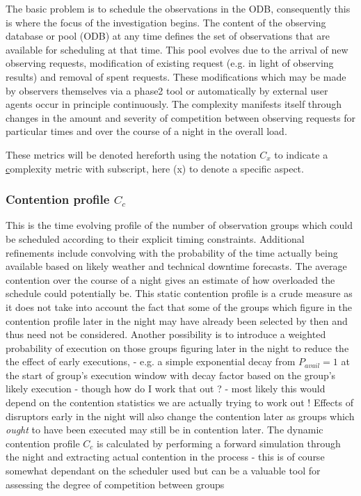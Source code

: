  The basic problem is to schedule the observations in the ODB, consequently this is where the focus of the investigation begins. The content of the observing database or pool (ODB) at any time defines the set of observations that are available for scheduling at that time. This pool evolves due to the arrival of new observing requests, modification of existing request (e.g. in light of observing results) and removal of spent requests. These modifications which may be made by observers themselves via a phase2 tool or automatically by external user agents occur in principle continuously. The complexity manifests itself through changes in the amount and severity of competition between observing requests for particular times and over the course of a night in the overall load.

These metrics will be denoted hereforth using the notation $C_x$ to indicate a \underline{c}omplexity metric with subscript, here (x) to denote a specific aspect.


\subsubsection{Contention profile $C_c$}
This is the time evolving profile of the number of observation groups which could be scheduled according to their explicit timing constraints. Additional refinements include convolving with the probability of the time actually being available based on likely weather and technical downtime forecasts. The average contention over the course of a night gives an estimate of how overloaded the schedule could potentially be. This static contention profile is a crude measure as it does not take into account the fact that some of the groups which figure in the contention profile later in the night may have already been selected by then and thus need not be considered. Another possibility is to introduce a weighted probability of execution on those groups figuring later in the night to reduce the the effect of early executions, - e.g. a simple exponential decay from $P_{avail}=1$ at the start of group's execution window with decay factor based on the group's likely execution - though how do I work that out ? - most likely this would depend on the contention statistics we are actually trying to work out ! Effects of disruptors early in the night will also change the contention later as groups which \emph{ought} to have been executed may still be in contention later. The dynamic contention profile $C_c$ is calculated by performing a forward simulation through the night and extracting actual contention in the process - this is of course somewhat dependant on the scheduler used but can be a valuable tool for assessing the degree of competition between groups

